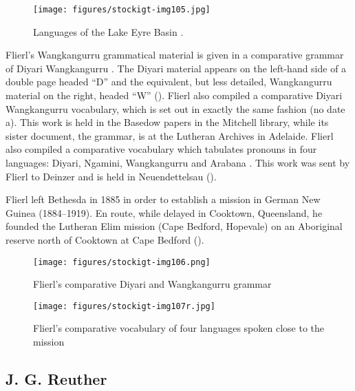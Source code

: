\begin{figure}
\texttt{[image: figures/stockigt-img105.jpg]}
\caption{Languages of the Lake Eyre Basin \citep{Anggarrgon2008}.}
\label{bkm:Ref337128069}\label{fig:key:158}
\end{figure}


Flierl’s Wangkangurru grammatical material is given in a comparative grammar of Diyari Wangkangurru \citeyearpar{flierl_dieri_1880}. The Diyari material appears on the left-hand side of a double page headed “D” and the equivalent, but less detailed, Wangkangurru material on the right, headed ``W'' (). Flierl also compiled a comparative Diyari Wangkangurru vocabulary, which is set out in exactly the same fashion (no date a). This work is held in the Basedow papers in the Mitchell library, while its sister document, the grammar, is at the Lutheran Archives in Adelaide. Flierl also compiled a comparative vocabulary which tabulates pronouns in four languages: Diyari, Ngamini, Wangkangurru and Arabana \citeyearpar{flierl_comparative_nodate}. This work was sent by Flierl to Deinzer and is held in Neuendettelsau ().

Flierl left Bethesda in 1885 in order to establish a mission in German New Guinea (1884--1919). En route, while delayed in Cooktown, Queensland, he founded the Lutheran Elim mission (Cape Bedford, Hopevale) on an Aboriginal reserve north of Cooktown at Cape Bedford ().


\begin{figure}
\texttt{[image: figures/stockigt-img106.png]}
\caption{Flierl’s comparative Diyari and Wangkangurru grammar \citeyearpar{flierl_dieri_1880}}
\label{bkm:Ref449375790}\label{fig:key:159}
\end{figure}



\begin{figure}
\texttt{[image: figures/stockigt-img107r.jpg]}
\caption{Flierl's comparative vocabulary of four languages spoken close to the mission \citeyearpar{flierl_christianieli_1880}}
\label{bkm:Ref449375817}\label{fig:key:160}
\end{figure}


\subsection{J. G. Reuther}
\label{sec:key:8.4.2}

